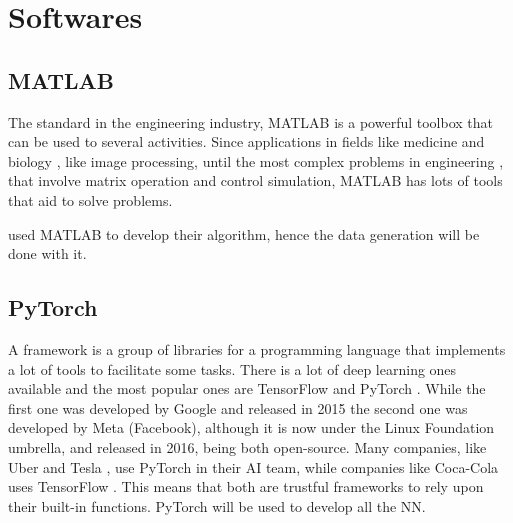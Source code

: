 \section{Softwares}

\subsection{MATLAB}

The standard in the engineering industry, MATLAB is a powerful toolbox that can be used to several activities.
Since applications in fields like medicine and biology \cite{demirkaya2009}, like image processing, until the most complex problems in engineering \cite{bansal}, that involve matrix operation and control simulation, MATLAB has lots of tools that aid to solve problems.

\textcite{geronel2023} used MATLAB to develop their algorithm, hence the data generation will be done with it.

\subsection{PyTorch}

A framework is a group of libraries for a programming language that implements a lot of tools to facilitate some tasks. 
There is a lot of deep learning ones available and the most popular ones are TensorFlow \cite{abadi2016} and PyTorch \cite{paszke2019}. 
While the first one was developed by Google and released in 2015 the second one was developed by Meta (Facebook), although it is now under the Linux Foundation umbrella, and released in 2016, being both open-source.
Many companies, like Uber \cite{goodman2017} and Tesla \cite{pytorch2019}, use PyTorch in their AI team, while companies like Coca-Cola uses TensorFlow \cite{tensorflow2018}.
This means that both are trustful frameworks to rely upon their built-in functions.
PyTorch will be used to develop all the NN.